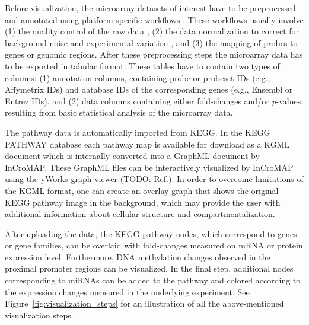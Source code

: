 \documentclass{bioinfo}
\begin{document}
Before visualization, the microarray datasets of interest have to be preprocessed and annotated
using platform-specific workflows \citep{Limma, AgiMicroRna}. These workflows usually involve (1)
the quality control of the raw data \citep{arrayQualityMetrics}, (2) the data normalization to
correct for background noise and experimental variation \citep{Lim2007}, and (3) the mapping of
probes to genes or genomic regions. After these preprocessing steps the microarray data has to be
exported in tabular format. These tables have to contain two types of columns: (1) annotation
columns, containing probe or probeset IDs (e.g., Affymetrix IDs) and database IDs of the
corresponding genes (e.g., Ensembl or Entrez IDs), and (2) data columns containing either
fold-changes and/or \emph{p}-values resulting from basic statistical analysis of the microarray
data.


The pathway data is automatically imported from KEGG. In the KEGG PATHWAY database each pathway map
is available for download as a KGML document which is internally converted into a GraphML document
by InCroMAP. These GraphML files can be interactively visualized by InCroMAP using the yWorks graph
viewer (TODO: Ref.). In order to overcome limitations of the KGML format, one can create an overlay
graph that shows the original KEGG pathway image in the background, which may provide the user with
additional information about cellular structure and compartmentalization.

After uploading the data, the KEGG pathway nodes, which correspond to genes or gene families, can be
overlaid with fold-changes measured on mRNA or protein expression level. Furthermore, DNA
methylation changes observed in the proximal promoter regions can be visualized. In the final step,
additional nodes corresponding to miRNAs can be added to the pathway and colored according to the
expression changes measured in the underlying experiment. See Figure~\ref{fig:visualization_steps}
for an illustration of all the above-mentioned visualization steps.
\end{document}
